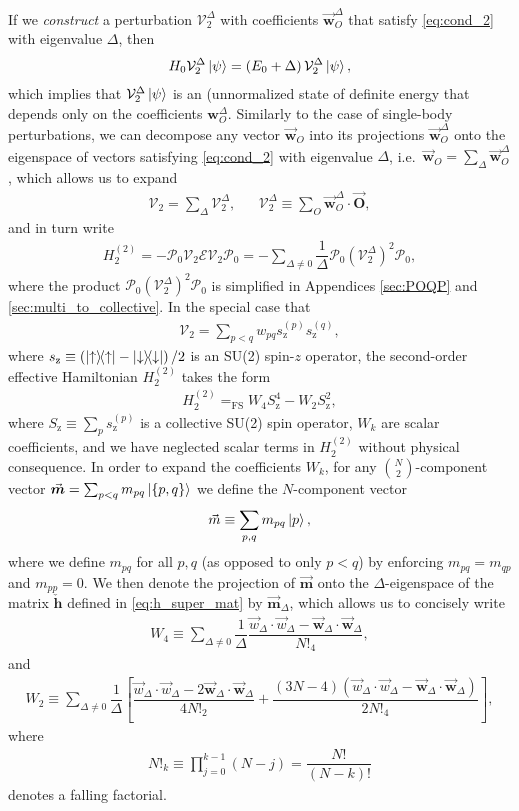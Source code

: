 \documentclass[nofootinbib,notitlepage,11pt]{revtex4-2}
\newcommand{\f}[2]{\dfrac{#1}{#2}} %
\newcommand{\p}[1]{\left(#1\right)} %
\renewcommand{\sp}[1]{\left[#1\right]} %
\renewcommand{\set}[1]{\left\{#1\right\}} %
\renewcommand{\c}{\cdot} %
\newcommand{\m}{\bm} %
\renewcommand{\v}{\vec} %
\newcommand{\1}{\mathds{1}}
\newcommand{\up}{\uparrow}
\newcommand{\dn}{\downarrow}
\newcommand{\z}{\text{z}}
\newcommand{\E}{\mathcal{E}}
\renewcommand{\P}{\mathcal{P}}
\newcommand{\V}{\mathcal{V}}
\newcommand{\EQFS}{=_{\text{FS}}}
\begin{document}
If we {\it construct} a perturbation $\V_2^\Delta$ with coefficients
$\v{\m w}_O^\Delta$ that satisfy \eqref{eq:cond_2} with eigenvalue
$\Delta$, then
\begin{align}
  H_0 \V_2^\Delta \ket\psi = \p{E_0 + \Delta} \V_2^\Delta \ket\psi,
\end{align}
which implies that $\V_2^\Delta\ket\psi$ is an (unnormalized state of
definite energy that depends only on the coefficients $\m w_O^\Delta$.
Similarly to the case of single-body perturbations, we can decompose
any vector $\v{\m w}_O$ into its projections $\v{\m w}_O^\Delta$ onto
the eigenspace of vectors satisfying \eqref{eq:cond_2} with eigenvalue
$\Delta$, i.e.~$\v{\m w}_O=\sum_\Delta\v{\m w}_O^\Delta$, which allows
us to expand
\begin{align}
  \V_2 = \sum_\Delta \V_2^\Delta,
  &&
  \V_2^\Delta \equiv \sum_O \v{\m w}_O^\Delta \c \v{\m O},
\end{align}
and in turn write
\begin{align}
  H_2^{(2)} = - \P_0 \V_2 \E \V_2 \P_0
  = -\sum_{\Delta\ne0} \f1\Delta \P_0 \p{\V_2^\Delta}^2 \P_0,
\end{align}
where the product $\P_0 \p{\V_2^\Delta}^2 \P_0$ is simplified in
Appendices \ref{sec:POQP} and \ref{sec:multi_to_collective}.  In the
special case that
\begin{align}
  \V_2 = \sum_{p<q} w_{pq} s_\z^{(p)} s_\z^{(q)},
\end{align}
where $s_\z\equiv\p{\op\up-\op\dn}/2$ is an SU(2) spin-$z$ operator,
the second-order effective Hamiltonian $H_2^{(2)}$ takes the form
\begin{align}
  H_2^{(2)} \EQFS W_4 S_\z^4 - W_2 S_\z^2,
\end{align}
where $S_\z\equiv\sum_p s_\z^{(p)}$ is a collective SU(2) spin
operator, $W_k$ are scalar coefficients, and we have neglected scalar
terms in $H_2^{(2)}$ without physical consequence.  In order to expand
the coefficients $W_k$, for any ${N \choose 2}$-component vector
$\v{\m m}=\sum_{p<q}m_{pq}\ket{\set{p,q}}$ we define the $N$-component
vector
\begin{align}
  \v m \equiv \sum_{p,q} m_{pq} \ket{p},
\end{align}
where we define $m_{pq}$ for all $p,q$ (as opposed to only $p<q$) by
enforcing $m_{pq}=m_{qp}$ and $m_{pp}=0$.  We then denote the
projection of $\v{\m m}$ onto the $\Delta$-eigenspace of the matrix
$\check{\m h}$ defined in \eqref{eq:h_super_mat} by $\v{\m m}_\Delta$,
which allows us to concisely write
\begin{align}
  W_4
  \equiv \sum_{\Delta\ne0} \f1\Delta \f{\v w_\Delta\c\v w_\Delta
    - \v{\m w}_\Delta\c\v{\m w}_\Delta}{N!_4},
\end{align}
and
\begin{align}
  W_2
  \equiv \sum_{\Delta\ne0} \f1{\Delta} \sp{\f{\v w_\Delta\c\v w_\Delta
      - 2\v{\m w}_\Delta\c\v{\m w}_\Delta}{4N!_2}
    + \f{\p{3N-4}\p{\v w_\Delta\c\v w_\Delta
        - \v{\m w}_\Delta\c\v{\m w}_\Delta}}{2N!_4}},
\end{align}
where
\begin{align}
  N!_k \equiv \prod_{j=0}^{k-1} \p{N-j} = \f{N!}{\p{N-k}!}
\end{align}
denotes a falling factorial.
\end{document}
